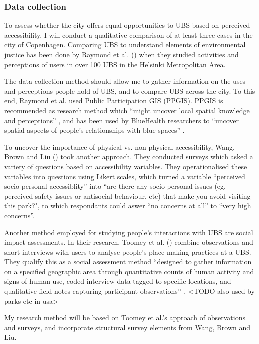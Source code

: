 \documentclass{article}
\begin{document}
\subsubsection{Data collection}

To assess whether the city offers equal opportunities to UBS based on perceived accessibility, I will conduct a qualitative comparison of at least three cases in the city of Copenhagen. Comparing UBS to understand elements of environmental justice has been done by Raymond et al. (\citeyear{raymond2016integrating}) when they studied activities and perceptions of users in over 100 UBS in the Helsinki Metropolitan Area. 

The data collection method should allow me to gather information on the uses and perceptions people hold of UBS, and to compare UBS across the city. To this end, Raymond et al. used Public Participation GIS (PPGIS). PPGIS is recommended as research method which “might uncover local spatial knowledge and perceptions” \parencite{anguelovski2020expanding}, and has been used by BlueHealth researchers to “uncover spatial aspects of people’s relationships with blue spaces” \parencite{bluehealthsoftgis}.

To uncover the importance of physical vs. non-physical accessibility, Wang, Brown and Liu (\citeyear{wang2015physical}) took another approach. They conducted surveys which asked a variety of questions based on accessibility variables. They operationalised these variables into questions using Likert scales, which turned a variable ``perceived socio-personal accessiblity'' into ``are there any socio-personal issues (eg. perceived safety issues or antisocial behaviour, etc) that make you avoid visiting this park?", to which respondants could aswer ``no concerns at all'' to ``very high concerns''.

Another method employed for studying people’s interactions with UBS are social impact assessments. In their research, Toomey et al. (\citeyear{toomey2021place}) combine observations and short interviews with users to analyse people’s place making practices at a UBS. They qualify this as a social assessment method ``designed to gather information on a specified geographic area through quantitative counts of human activity and signs of human use, coded interview data tagged to specific locations, and qualitative field notes capturing participant observations’’ \parencite{toomey2021place}. <TODO also used by parks etc in usa>
 
My research method will be based on Toomey et al.'s approach of observations and surveys, and incorporate structural survey elements from Wang, Brown and Liu. 
\end{document}

